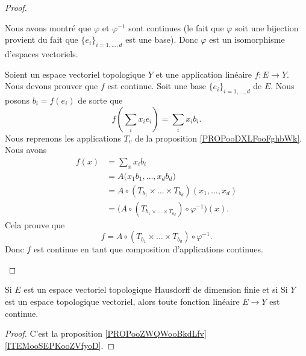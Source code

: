 \begin{proof}
\begin{subproof}
		Nous avons montré que \( \varphi\) et \( \varphi^{-1}\) sont continues (le fait que \( \varphi\) soit une bijection provient du fait que \( \{ e_i \}_{i=1,\ldots,d}\) est une base). Donc \( \varphi\) est un isomorphisme d'espaces vectoriels.

		Soient un espace vectoriel topologique \( Y\) et une application linéaire \(f \colon E\to Y  \). Nous devons prouver que \( f\) est continue. Soit une base \( \{ e_i \}_{i=1,\ldots,d}\) de \( E\). Nous posons \( b_i=f(e_i)\) de sorte que
		\begin{equation}
			f(\sum_ix_ie_i)=\sum_ix_ib_i.
		\end{equation}
		Nous reprenons les applications \( T_v\) de la proposition \ref{PROPooDXLFooFghbWk}. Nous avons
		\begin{subequations}
			\begin{align}
				f(x) & = \sum_xx_ib_i                                                                   \\
				     & = A\big( x_1b_1,\ldots,x_db_d \big)                                              \\
				     & = A\circ(T_{b_1}\times\ldots\times T_{b_d})(x_1,\ldots,x_d)                      \\
				     & = \big(  A\circ (T_{b_1\times \ldots\times T_{b_d}})\circ \varphi^{-1} \big)(x).
			\end{align}
		\end{subequations}
		Cela prouve que
		\begin{equation}
			f=A\circ(T_{b_1}\times \ldots\times T_{b_d})\circ\varphi^{-1}.
		\end{equation}
		Donc \( f\) est continue en tant que composition d'applications continues.
	\end{subproof}
\end{proof}


\begin{proposition}     \label{PROPooBEHTooBrLWuh}
	Si \( E\) est un espace vectoriel topologique Hausdorff de dimension finie et si Si \( Y\) est un espace topologique vectoriel, alors toute fonction linéaire \( E \to Y \) est continue.
\end{proposition}

\begin{proof}
	C'est la proposition \ref{PROPooZWQWooBkdLfv}\ref{ITEMooSEPKooZVfyoD}.
\end{proof}

